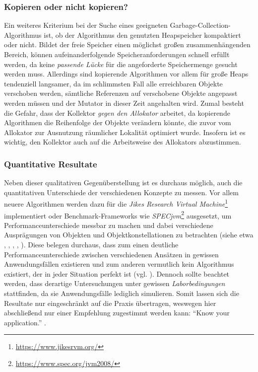 \subsubsection*{Kopieren oder nicht kopieren?}
Ein weiteres Kriterium bei der Suche eines geeigneten Garbage-Collection-Algorithmus ist, ob der Algorithmus den genutzten Heapspeicher kompaktiert oder nicht.
Bildet der freie Speicher einen möglichst großen zusammenhängenden Bereich, können aufeinanderfolgende Speicheranforderungen schnell erfüllt werden, da keine \textit{passende Lücke} für die angeforderte Speichermenge gesucht werden muss.
Allerdings sind kopierende Algorithmen vor allem für große Heaps tendenziell langsamer, da im schlimmsten Fall alle erreichbaren Objekte verschoben werden, sämtliche Referenzen auf verschobene Objekte angepasst werden müssen und der Mutator in dieser Zeit angehalten wird.
Zumal besteht die Gefahr, dass der Kollektor \textit{gegen den Allokator} arbeitet, da kopierende Algorithmen die Reihenfolge der Objekte verändern könnte, die zuvor vom Allokator zur Ausnutzung räumlicher Lokalität optimiert wurde.
Insofern ist es wichtig, den Kollektor auch auf die Arbeitsweise des Allokators abzustimmen.




\subsubsection*{Quantitative Resultate}
Neben dieser qualitativen Gegenüberstellung ist es durchaus möglich, auch die quantitativen Unterschiede der verschiedenen Konzepte zu messen.
Vor allem neuere Algorithmen werden dazu für die \textit{Jikes Research Virtual Machine}\footnote{\url{https://www.jikesrvm.org/}} implementiert oder Benchmark-Frameworks wie \textit{SPECjvm}\footnote{\url{https://www.spec.org/jvm2008/}} ausgesetzt, um Performanceunterschiede messbar zu machen und dabei verschiedene Ausprägungen von Objekten und Objektkonstellationen zu betrachten (siehe etwa \cite{blackburn2003}, \cite{blackburn2004}, \cite{kermany2006}, \cite{levanoni2006}, \cite{garner2007}).
Diese belegen durchaus, dass zum einen deutliche Performanceunterschiede zwischen verschiedenen Ansätzen in gewissen Anwendungsfällen existieren und zum anderen vermutlich kein Algorithmus existiert, der in jeder Situation perfekt ist (vgl. \cite{fitzgerald2000}).
Dennoch sollte beachtet werden, dass derartige Untersuchungen unter gewissen \textit{Laborbedingungen} stattfinden, da sie Anwendungsfälle lediglich simulieren.
Somit lassen sich die Resultate nur eingeschränkt auf die Praxis übertragen, weswegen hier abschließend nur einer Empfehlung zugestimmt werden kann: \enquote{Know your application.} \cite[S. 80]{handbook}.
